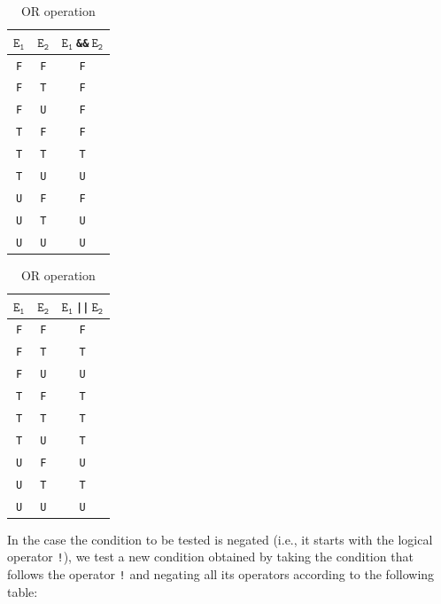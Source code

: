 \documentclass{article}
\begin{document}
\begin{table}[H]
\parbox{.45\linewidth}{
\centering
\begin{tabular}{|c|c|c|}
\hline
$\mathtt{E_1}$   & $\mathtt{E_2}$   & \texttt{$\mathtt{E_1}\: $\&\&$\: \mathtt{E_2}$} \\ \hline
\texttt{F}   & \texttt{F}   & \texttt{F}   \\ \hline
\texttt{F}   & \texttt{T}    & \texttt{F}   \\ \hline
\texttt{F}   & \texttt{U} & \texttt{F}   \\ \hline
\texttt{T}    & \texttt{F}   & \texttt{F}   \\ \hline
\texttt{T}    & \texttt{T}    & \texttt{T}    \\ \hline
\texttt{T}    & \texttt{U} & \texttt{U} \\ \hline
\texttt{U} & \texttt{F}   & \texttt{F}   \\ \hline
\texttt{U} & \texttt{T}    & \texttt{U} \\ \hline
\texttt{U} & \texttt{U} & \texttt{U} \\ \hline
\end{tabular}
\caption{AND operation}
}
\hfill
\parbox{.45\linewidth}{
\centering
\begin{tabular}{|c|c|c|}
\hline
$\mathtt{E_1}$   & $\mathtt{E_2}$   &  \texttt{$\mathtt{E_1}\: $||$\: \mathtt{E_2}$}\\ \hline
\texttt{F}   & \texttt{F}   & \texttt{F}   \\ \hline
\texttt{F}   & \texttt{T}    & \texttt{T}    \\ \hline
\texttt{F}   & \texttt{U} & \texttt{U} \\ \hline
\texttt{T}    & \texttt{F}   & \texttt{T}    \\ \hline
\texttt{T}    & \texttt{T}    & \texttt{T}    \\ \hline
\texttt{T}    & \texttt{U} & \texttt{T}    \\ \hline
\texttt{U} & \texttt{F}   & \texttt{U} \\ \hline
\texttt{U} & \texttt{T}    & \texttt{T}    \\ \hline
\texttt{U} & \texttt{U} & \texttt{U} \\ \hline
\end{tabular}
\caption{OR operation}
}
\end{table}

\noindent
In the case the condition to be tested is negated (i.e., it starts with the logical operator \texttt{!}), we test a new condition obtained by taking the condition that follows the operator \texttt{!} and negating all its operators according to the following table:
\end{document}

